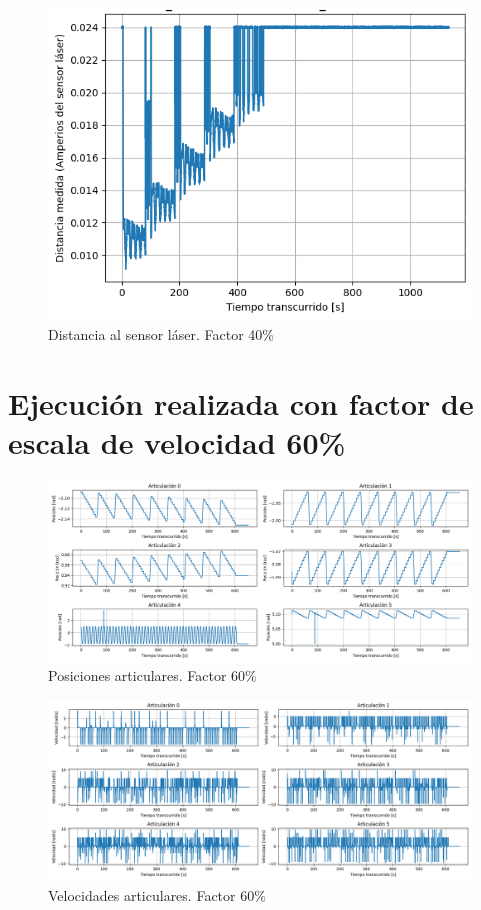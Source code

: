 \begin{figure}[H]
    \centering
    \includegraphics[scale=0.50]{figuras/ensayo_control_velocidad/laser 0.4.png}
    \caption{Distancia al sensor láser. Factor 40\%}
    \label{fig:laser 0.4}
\end{figure}

\section{Ejecución realizada con factor de escala de velocidad 60\%}

\begin{figure}[H]
    \centering
    \includegraphics[scale=0.30]{figuras/ensayo_control_velocidad/posiciones articulares 0.6.png}
    \caption{Posiciones articulares. Factor 60\%}
    \label{fig:posiciones articulares 0.6}
\end{figure}

\begin{figure}[H]
    \centering
    \includegraphics[scale=0.30]{figuras/ensayo_control_velocidad/velocidades articulares 0.6.png}
    \caption{Velocidades articulares. Factor 60\%}
    \label{fig:velocidades articulares 0.6}
\end{figure}

